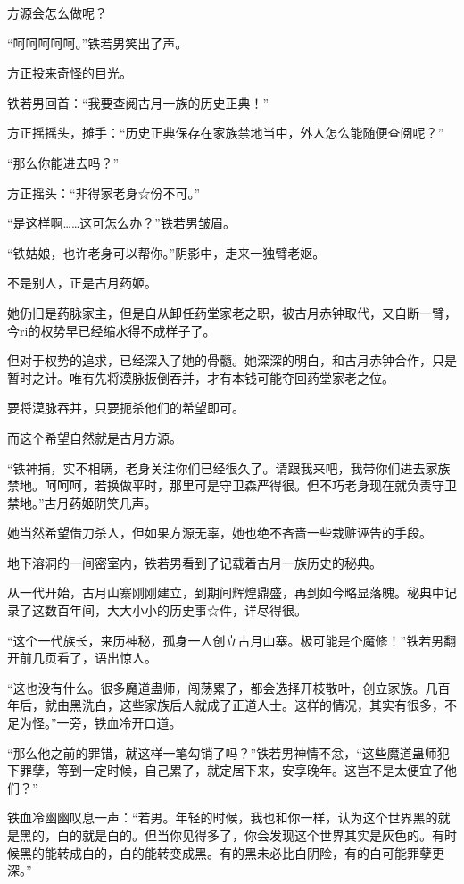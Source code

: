 \begin{this_body}
方源会怎么做呢？

“呵呵呵呵呵。”铁若男笑出了声。

方正投来奇怪的目光。

铁若男回首：“我要查阅古月一族的历史正典！”

方正摇摇头，摊手：“历史正典保存在家族禁地当中，外人怎么能随便查阅呢？”

“那么你能进去吗？”

方正摇头：“非得家老身☆份不可。”

“是这样啊……这可怎么办？”铁若男皱眉。

“铁姑娘，也许老身可以帮你。”阴影中，走来一独臂老妪。

不是别人，正是古月药姬。

她仍旧是药脉家主，但是自从卸任药堂家老之职，被古月赤钟取代，又自断一臂，今ri的权势早已经缩水得不成样子了。

但对于权势的追求，已经深入了她的骨髓。她深深的明白，和古月赤钟合作，只是暂时之计。唯有先将漠脉扳倒吞并，才有本钱可能夺回药堂家老之位。

要将漠脉吞并，只要扼杀他们的希望即可。

而这个希望自然就是古月方源。

“铁神捕，实不相瞒，老身关注你们已经很久了。请跟我来吧，我带你们进去家族禁地。呵呵呵，若换做平时，那里可是守卫森严得很。但不巧老身现在就负责守卫禁地。”古月药姬阴笑几声。

她当然希望借刀杀人，但如果方源无辜，她也绝不吝啬一些栽赃诬告的手段。

地下溶洞的一间密室内，铁若男看到了记载着古月一族历史的秘典。

从一代开始，古月山寨刚刚建立，到期间辉煌鼎盛，再到如今略显落魄。秘典中记录了这数百年间，大大小小的历史事☆件，详尽得很。

“这个一代族长，来历神秘，孤身一人创立古月山寨。极可能是个魔修！”铁若男翻开前几页看了，语出惊人。

“这也没有什么。很多魔道蛊师，闯荡累了，都会选择开枝散叶，创立家族。几百年后，就由黑洗白，这些家族后人就成了正道人士。这样的情况，其实有很多，不足为怪。”一旁，铁血冷开口道。

“那么他之前的罪错，就这样一笔勾销了吗？”铁若男神情不忿，“这些魔道蛊师犯下罪孽，等到一定时候，自己累了，就定居下来，安享晚年。这岂不是太便宜了他们？”

铁血冷幽幽叹息一声：“若男。年轻的时候，我也和你一样，认为这个世界黑的就是黑的，白的就是白的。但当你见得多了，你会发现这个世界其实是灰色的。有时候黑的能转成白的，白的能转变成黑。有的黑未必比白阴险，有的白可能罪孽更深。”


\end{this_body}
